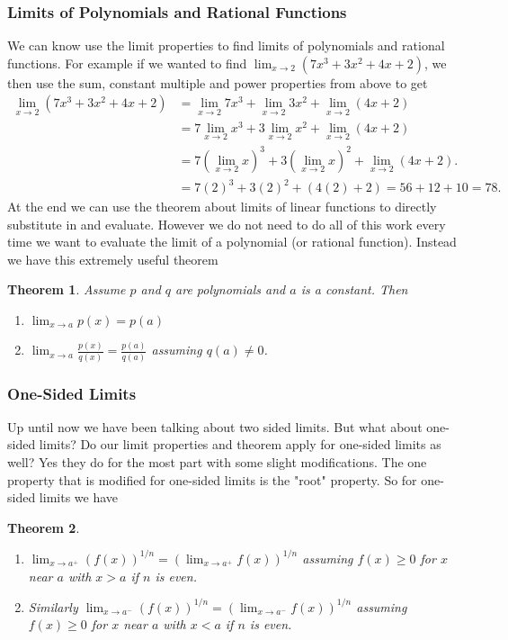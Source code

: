 \documentclass[12pt,reqno]{article}
\newtheorem{Theorem}{Theorem}
\theoremstyle{definition}
\begin{document}
\subsubsection{Limits of Polynomials and Rational Functions} 
We can know use the limit properties to find limits of polynomials and rational functions. For example if we wanted to find $\lim_{x \to 2} (7 x^3 + 3 x^2 + 4x + 2)$, we then use the sum, constant multiple and power properties from above to get
\begin{align*}
	\lim_{x \to 2} (7 x^3 + 3 x^2 + 4x + 2) &= \lim_{x\to 2} 7x^3 + \lim_{x\to2} 3x^2 + \lim_{x\to2}(4x + 2) \\
										    &= 7 \lim_{x\to 2} x^3 + 3 \lim_{x\to 2} x^2 + \lim_{x\to 2}(4x + 2) \\
										    &= 7 (\lim_{x \to 2} x)^3 + 3 (\lim_{x \to 2} x)^2 + \lim_{x \to 2}(4x + 2). \\
										    &= 7 (2)^3 + 3 (2)^2 + (4(2) + 2) = 56 + 12 + 10 = 78.
\end{align*}
At the end we can use the theorem about limits of linear functions to directly substitute in and evaluate. However we do not need to do all of this work every time we want to evaluate the limit of a polynomial (or rational function). Instead we have this extremely useful theorem 
\begin{Theorem}
	Assume $p$ and $q$ are polynomials and $a$ is a constant. Then 
	\begin{enumerate}
		\item $\lim_{x\to a} p(x) = p(a)$ 
		\item $\lim_{x \to a} \frac{p(x)}{q(x)} = \frac{p(a)}{q(a)}$ assuming $q(a) \neq 0$. 
	\end{enumerate}
\end{Theorem}
	
\subsubsection{One-Sided Limits}
Up until now we have been talking about two sided limits. But what about one-sided limits? Do our limit properties and theorem apply for one-sided limits as well? Yes they do for the most part with some slight modifications. The one property that is modified for one-sided limits is the "root" property. So for one-sided limits we have 
\begin{Theorem}
	\begin{enumerate}
		\item $\lim_{x \to a^+} (f(x))^{1/n} = (\lim_{x \to a^+} f(x))^{1/n}$ assuming $f(x) \geq 0$ for $x$ near $a$ with $x > a$ if $n$ is even.
		\item Similarly $\lim_{x \to a^-} (f(x))^{1/n} = (\lim_{x \to a^-} f(x))^{1/n}$ assuming $f(x) \geq 0$ for $x$ near $a$ with $x < a$ if $n$ is even. 
	\end{enumerate}
\end{Theorem}
\end{document}
